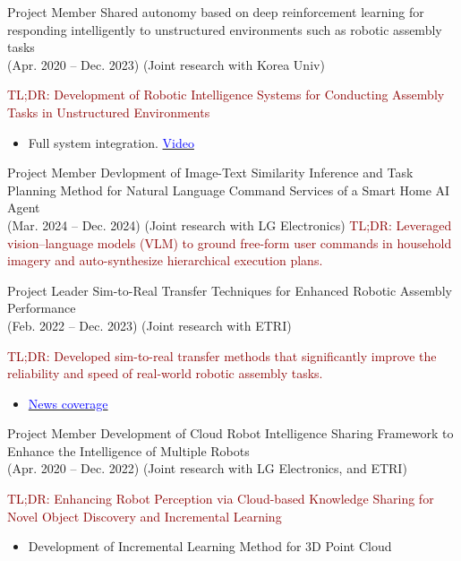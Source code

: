 \documentclass[9pt]{developercv} %
\begin{document}
\begin{entrylist}
    
    \entry
		{Project Member}
		{Shared autonomy based on deep reinforcement learning for responding intelligently to unstructured environments such as robotic assembly tasks}
		{\\(Apr. 2020 -- Dec. 2023) (Joint research with Korea Univ)}
		{%
        \textcolor{darkred}{TL;DR: Development of Robotic Intelligence Systems for Conducting Assembly Tasks in Unstructured Environments}
            \begin{itemize}
                \item Full system integration. \href{https://youtu.be/S3XjGVW2-iw}{\textcolor{blue}{\faVideoCamera\;Video}}
            \end{itemize}
            }
            
    \entry
		{Project Member}
		{Devlopment of Image-Text Similarity Inference and Task Planning Method for Natural Language Command Services of a Smart Home AI Agent}
		{\\(Mar. 2024 -- Dec. 2024) (Joint research with LG Electronics)}
		{%
            \textcolor{darkred}{TL;DR: Leveraged vision–language models (VLM) to ground free-form user commands in household imagery and auto-synthesize hierarchical execution plans.}
            }

    \entry
      {Project Leader}
      {Sim-to-Real Transfer Techniques for Enhanced Robotic Assembly Performance}
      {\\(Feb. 2022 -- Dec. 2023) (Joint research with ETRI)}
      {
        \textcolor{darkred}{TL;DR: Developed sim-to-real transfer methods that significantly improve the reliability and speed of real-world robotic assembly tasks.}
        \begin{itemize}
            \item \href{https://www.hellodd.com/news/articleView.html?idxno=102536}%
            {\textcolor{blue}{\faFileTextO\;News coverage}}
        \end{itemize}
      }

    \entry
		{Project Member}
		{Development of Cloud Robot Intelligence Sharing Framework to Enhance the Intelligence of Multiple Robots}
		{\\(Apr. 2020 -- Dec. 2022) (Joint research with LG Electronics, and ETRI)}
		{%
        \textcolor{darkred}{TL;DR: Enhancing Robot Perception via Cloud-based Knowledge Sharing for Novel Object Discovery and
Incremental Learning}
            \begin{itemize}
                \item Development of Incremental Learning Method for 3D Point Cloud
            \end{itemize}
            }

            
\end{entrylist}
\end{document}
